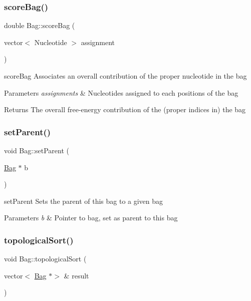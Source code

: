 \subsubsection{\texorpdfstring{score\+Bag()}{scoreBag()}}
{\footnotesize\ttfamily double Bag\+::score\+Bag (\begin{DoxyParamCaption}\item[{vector$<$ Nucleotide $>$}]{assignment }\end{DoxyParamCaption})}



score\+Bag Associates an overall contribution of the proper nucleotide in the bag 


\begin{DoxyParams}{Parameters}
{\em assignments} & Nucleotides assigned to each positions of the bag \\
\hline
\end{DoxyParams}
\begin{DoxyReturn}{Returns}
The overall free-\/energy contribution of the (proper indices in) the bag 
\end{DoxyReturn}
\mbox{\label{class_bag_a44101c6b26782dbe076d51e77f35ce81}} 
\subsubsection{\texorpdfstring{set\+Parent()}{setParent()}}
{\footnotesize\ttfamily void Bag\+::set\+Parent (\begin{DoxyParamCaption}\item[{\hyperlink{class_bag}{Bag} $\ast$}]{b }\end{DoxyParamCaption})}



set\+Parent Sets the parent of this bag to a given bag 


\begin{DoxyParams}{Parameters}
{\em b} & Pointer to bag, set as parent to this bag \\
\hline
\end{DoxyParams}
\mbox{\label{class_bag_a736149a37eb50ff5c3905a2a6c757240}} 
\subsubsection{\texorpdfstring{topological\+Sort()}{topologicalSort()}}
{\footnotesize\ttfamily void Bag\+::topological\+Sort (\begin{DoxyParamCaption}\item[{vector$<$ \hyperlink{class_bag}{Bag} $\ast$$>$ \&}]{result }\end{DoxyParamCaption})}



